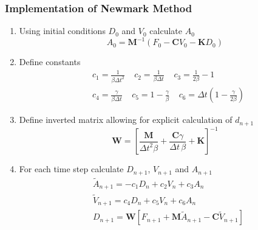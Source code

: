 \documentclass[xcolor=svgnames,9pt]{beamer}
\theoremstyle{remark}
\begin{document}
		\begin{frame}
  			\frametitle{Implementation of Newmark Method}
			\begin{enumerate}
				\item Using initial conditions $D_0$ and $V_0$ calculate $A_0$
					\begin{equation*}
						A_{{0}}= \textbf{M}^{-1} (F_{{0}} -\textbf{C}V_{{0}}-\textbf{K}D_{{0}})
					\end{equation*}
				\item Define constants
					\begin{align*}
						&c_1 = {\frac {1}{{\beta \Delta t}^{2}}}\ \ \ \ \ c_2 =\frac{1}{\beta \Delta t }\ \ \ \ \ c_3 = \frac{1}{2\beta}-1\\
						&c_4 = \frac {\gamma}{\beta \Delta t}\ \ \ \ \ c_5 = 1-{\frac {\gamma}{\beta}}\ \ \ \ \ c_6 = \Delta t \left( 1-{\frac {\gamma}{2\beta}} \right)
					\end{align*}
				\item Define inverted matrix allowing for explicit calculation of $d_{n+1}$
					\begin{equation*}
						\textbf{W}=\left[{\frac {\textbf{M}}{{\Delta t}^{2}\beta}}+{\frac {\textbf{C}\gamma}{\Delta t\,\beta}}+\textbf{K}\right]^{-1}
					\end{equation*}
				\item For each time step calculate $D_{n+1}$, $V_{n+1}$ and $A_{n+1}$
					\begin{align*}
						&\widetilde{A}_{{n+1}}=-c_1D_n+c_2V_n+c_3A_n\\
						&\widetilde{V}_{{n+1}}=c_4D_n+c_5V_n+c_6A_n\\
						&D_{{n+1}}=\textbf{W}[F_{{n+1}}+\textbf{M}\widetilde{A}_{{n+1}}-\textbf{C}\widetilde{V}_{{n+1}}]
					\end{align*}
			\end{enumerate}
		\end{frame}
\end{document}
